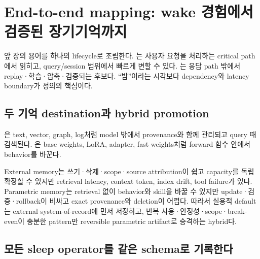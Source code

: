 \chapter{End-to-end mapping: wake 경험에서 검증된 장기기억까지}
\label{bg:chapter-stc-mapping}

앞 장의 용어를 하나의 lifecycle로 조립한다. 는 사용자 요청을 처리하는
critical path에서 읽히고, query/session 범위에서 빠르게 변할 수 있다. 는
응답 path 밖에서 replay·학습·압축·검증되는 후보다. ``밤''이라는 시각보다 dependency와 latency boundary가
정의의 핵심이다.

\section{두 기억 destination과 hybrid promotion}

은 text, vector, graph, log처럼 model 밖에서 provenance와 함께
관리되고 query 때 검색된다. 은 base weights, LoRA, adapter,
fast weights처럼 forward 함수 안에서 behavior를 바꾼다.

External memory는 쓰기·삭제·scope·source attribution이 쉽고 capacity를 독립 확장할 수 있지만 retrieval
latency, context token, index drift, tool failure가 있다. Parametric memory는 retrieval 없이 behavior와
skill을 바꿀 수 있지만 update·검증·rollback이 비싸고 exact provenance와 deletion이 어렵다. 따라서
실용적 default는 external system-of-record에 먼저 저장하고, 반복 사용·안정성·scope·break-even이
충분한 pattern만 reversible parametric artifact로 승격하는 hybrid다.

\section{모든 sleep operator를 같은 schema로 기록한다}

